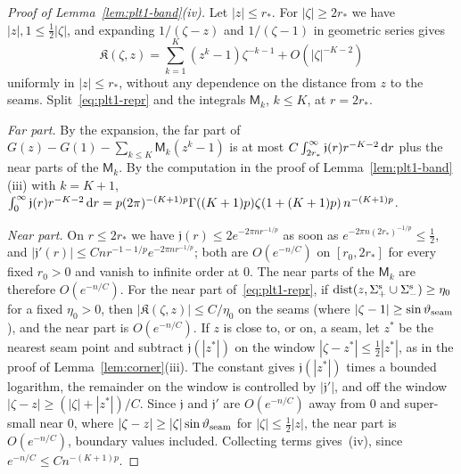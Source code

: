 \begin{proof}[Proof of Lemma~\textup{\ref{lem:plt1-band}(iv)}]
Let $|z|\le r_*$. For $|\zeta|\ge2r_*$ we have $|z|,1\le\frac12|\zeta|$, and expanding $1/(\zeta-z)$ and $1/(\zeta-1)$ in
geometric series gives
\[
  \mathfrak K(\zeta,z)=\sum_{k=1}^K(z^k-1)\zeta^{-k-1}+O(|\zeta|^{-K-2})
\]
uniformly in $|z|\le r_*$, without any dependence on the distance from $z$ to the seams. Split~\eqref{eq:plt1-repr} and
the integrals $\mathsf M_k$, $k\le K$, at $r=2r_*$.

\emph{Far part.} By the expansion, the far part of $G(z)-G(1)-\sum_{k\le K}\mathsf M_k(z^k-1)$ is at most
$C\int_{2r_*}^\infty\mathfrak j(r)r^{-K-2}\,\mathrm{d} r$ plus the near parts of the $\mathsf M_k$. By the computation in the proof of
Lemma~\ref{lem:plt1-band}(iii) with $k=K+1$,
$\int_0^\infty\mathfrak j(r)r^{-K-2}\,\mathrm{d} r=p(2\pi)^{-(K+1)p}\Gamma((K+1)p)\zeta(1+(K+1)p)\,n^{-(K+1)p}$.

\emph{Near part.} On $r\le2r_*$ we have $\mathfrak j(r)\le2e^{-2\pi nr^{-1/p}}$ as soon as
$e^{-2\pi n(2r_*)^{-1/p}}\le\frac12$, and $|\mathfrak j'(r)|\le Cnr^{-1-1/p}e^{-2\pi nr^{-1/p}}$; both are $O(e^{-n/C})$ on
$[r_0,2r_*]$ for every fixed $r_0>0$ and vanish to infinite order at $0$. The near parts of the $\mathsf M_k$ are therefore
$O(e^{-n/C})$. For the near part of~\eqref{eq:plt1-repr}, if $\mathrm{dist}(z,\Sigma^{\mathrm{s}}_+\cup\Sigma^{\mathrm{s}}_-)\ge\eta_0$ for a fixed
$\eta_0>0$, then $|\mathfrak K(\zeta,z)|\le C/\eta_0$ on the seams (where $|\zeta-1|\ge\sin\vartheta_{\mathrm{seam}}$), and the near part is
$O(e^{-n/C})$. If $z$ is close to, or on, a seam, let $z^*$ be the nearest seam point and subtract $\mathfrak j(|z^*|)$ on the
window $|\zeta-z^*|\le\frac12|z^*|$, as in the proof of Lemma~\ref{lem:corner}(iii). The constant gives
$\mathfrak j(|z^*|)$ times a bounded logarithm, the remainder on the window is controlled by $|\mathfrak j'|$, and off
the window $|\zeta-z|\ge(|\zeta|+|z^*|)/C$. Since $\mathfrak j$ and $\mathfrak j'$ are $O(e^{-n/C})$ away from $0$ and
super-small near $0$, where $|\zeta-z|\ge|\zeta|\sin\vartheta_{\mathrm{seam}}$ for $|\zeta|\le\frac12|z|$, the near part is $O(e^{-n/C})$,
boundary values included. Collecting terms gives~(iv), since $e^{-n/C}\le Cn^{-(K+1)p}$.
\end{proof}

